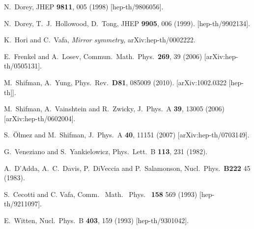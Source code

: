 \documentclass[epsfig,12pt]{article}
\newcommand{\ntwo}{${\mathcal N}=2\,$}
\begin{document}
\begin{thebibliography}{99}

N.~Dorey,
JHEP {\bf 9811}, 005 (1998) [hep-th/9806056].

  N.~Dorey, T.~J.~Hollowood, D.~Tong,
  JHEP {\bf 9905}, 006 (1999).
  [hep-th/9902134].

  K.~Hori and C.~Vafa,
{\em Mirror symmetry,}
  arXiv:hep-th/0002222.
  
E.~Frenkel and A.~Losev,
  Commun.\ Math.\ Phys.\  {\bf 269}, 39 (2006)
  [arXiv:hep-th/0505131].

  M.~Shifman, A.~Yung,
  Phys.\ Rev.\  {\bf D81}, 085009 (2010).
  [arXiv:1002.0322 [hep-th]].

  M.~Shifman, A.~Vainshtein and R.~Zwicky,
  J.\ Phys.\ A  {\bf 39}, 13005 (2006)
  [arXiv:hep-th/0602004].

  S.~\"{O}lmez and M.~Shifman,
  J.\ Phys.\ A  {\bf 40}, 11151 (2007)
  [arXiv:hep-th/0703149].

 G.~Veneziano and S.~Yankielowicz,
  Phys.\ Lett.\  B {\bf 113}, 231 (1982).

A.~D'Adda, A.~C.~Davis, P.~DiVeccia and P.~Salamonson,
Nucl.\ Phys.\ {\bf B222} 45 (1983).

S.~Cecotti and C. Vafa,
Comm. \ Math. \ Phys. \ {\bf 158} 569 (1993)
[hep-th/9211097].

E.~Witten,
  Nucl.\ Phys.\ B {\bf 403}, 159 (1993)
  [hep-th/9301042].


\end{thebibliography}
\end{document}
